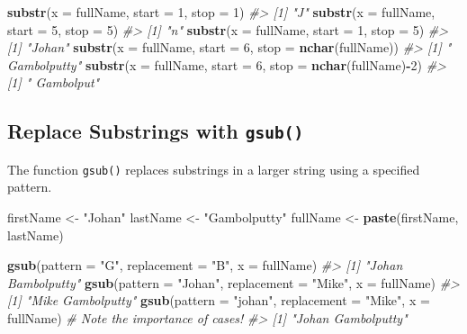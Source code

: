 \documentclass[]{book}
\newenvironment{Shaded}{\begin{snugshade}}{\end{snugshade}}
\newcommand{\KeywordTok}[1]{\textcolor[rgb]{0.13,0.29,0.53}{\textbf{#1}}}
\newcommand{\DataTypeTok}[1]{\textcolor[rgb]{0.13,0.29,0.53}{#1}}
\newcommand{\DecValTok}[1]{\textcolor[rgb]{0.00,0.00,0.81}{#1}}
\newcommand{\StringTok}[1]{\textcolor[rgb]{0.31,0.60,0.02}{#1}}
\newcommand{\CommentTok}[1]{\textcolor[rgb]{0.56,0.35,0.01}{\textit{#1}}}
\newcommand{\OperatorTok}[1]{\textcolor[rgb]{0.81,0.36,0.00}{\textbf{#1}}}
\newcommand{\NormalTok}[1]{#1}
\begin{document}
\begin{Shaded}
\begin{Highlighting}[]
\KeywordTok{substr}\NormalTok{(}\DataTypeTok{x =}\NormalTok{ fullName, }\DataTypeTok{start =} \DecValTok{1}\NormalTok{, }\DataTypeTok{stop =} \DecValTok{1}\NormalTok{)}
\CommentTok{#> [1] "J"}
\KeywordTok{substr}\NormalTok{(}\DataTypeTok{x =}\NormalTok{ fullName, }\DataTypeTok{start =} \DecValTok{5}\NormalTok{, }\DataTypeTok{stop =} \DecValTok{5}\NormalTok{)}
\CommentTok{#> [1] "n"}
\KeywordTok{substr}\NormalTok{(}\DataTypeTok{x =}\NormalTok{ fullName, }\DataTypeTok{start =} \DecValTok{1}\NormalTok{, }\DataTypeTok{stop =} \DecValTok{5}\NormalTok{)}
\CommentTok{#> [1] "Johan"}
\KeywordTok{substr}\NormalTok{(}\DataTypeTok{x =}\NormalTok{ fullName, }\DataTypeTok{start =} \DecValTok{6}\NormalTok{, }\DataTypeTok{stop =} \KeywordTok{nchar}\NormalTok{(fullName))}
\CommentTok{#> [1] " Gambolputty"}
\KeywordTok{substr}\NormalTok{(}\DataTypeTok{x =}\NormalTok{ fullName, }\DataTypeTok{start =} \DecValTok{6}\NormalTok{, }\DataTypeTok{stop =} \KeywordTok{nchar}\NormalTok{(fullName)}\OperatorTok{-}\DecValTok{2}\NormalTok{)}
\CommentTok{#> [1] " Gambolput"}
\end{Highlighting}
\end{Shaded}

\subsection{\texorpdfstring{Replace Substrings with
\texttt{gsub()}}{Replace Substrings with gsub()}}\label{replace-substrings-with-gsub}

The function \texttt{gsub()} replaces substrings in a larger string
using a specified pattern.

\begin{Shaded}
\begin{Highlighting}[]
\NormalTok{firstName <-}\StringTok{ "Johan"}
\NormalTok{lastName <-}\StringTok{ "Gambolputty"}
\NormalTok{fullName <-}\StringTok{ }\KeywordTok{paste}\NormalTok{(firstName, lastName)}

\KeywordTok{gsub}\NormalTok{(}\DataTypeTok{pattern =} \StringTok{"G"}\NormalTok{, }\DataTypeTok{replacement =} \StringTok{"B"}\NormalTok{, }\DataTypeTok{x =}\NormalTok{ fullName)}
\CommentTok{#> [1] "Johan Bambolputty"}
\KeywordTok{gsub}\NormalTok{(}\DataTypeTok{pattern =} \StringTok{"Johan"}\NormalTok{, }\DataTypeTok{replacement =} \StringTok{"Mike"}\NormalTok{, }\DataTypeTok{x =}\NormalTok{ fullName)}
\CommentTok{#> [1] "Mike Gambolputty"}
\KeywordTok{gsub}\NormalTok{(}\DataTypeTok{pattern =} \StringTok{"johan"}\NormalTok{, }\DataTypeTok{replacement =} \StringTok{"Mike"}\NormalTok{, }\DataTypeTok{x =}\NormalTok{ fullName) }\CommentTok{# Note the importance of cases!}
\CommentTok{#> [1] "Johan Gambolputty"}
\end{Highlighting}
\end{Shaded}
\end{document}
